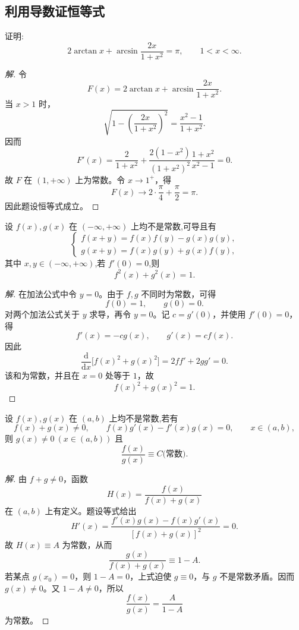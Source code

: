 \documentclass[../../数学分析培优讲义(答案版).tex]{subfiles}
\begin{document}
\subsection{利用导数证恒等式}

\begin{example}
证明:
\[
    2\arctan x+\arcsin\dfrac{2x}{1+x^2}=\pi,
    \qquad 1<x<\infty.
\]
\end{example}

\begin{proof}[解]
令
\[
    F(x)=2\arctan x+\arcsin\dfrac{2x}{1+x^2}.
\]
当 $x>1$ 时，
\[
    \sqrt{1-\left(\dfrac{2x}{1+x^2}\right)^2}
    =\dfrac{x^2-1}{1+x^2}.
\]
因而
\[
    F'(x)=\dfrac{2}{1+x^2}
    +\dfrac{2(1-x^2)}{(1+x^2)^2}
    \dfrac{1+x^2}{x^2-1}=0.
\]
故 $F$ 在 $(1,+\infty)$ 上为常数。令 $x\to1^+$，得
\[
    F(x)\longrightarrow2\cdot\dfrac{\pi}{4}+\dfrac{\pi}{2}=\pi.
\]
因此题设恒等式成立。
\end{proof}

\begin{example}
设 $f(x),g(x)$ 在 $(-\infty,+\infty)$ 上均不是常数,可导且有
\[
\begin{cases}
    f(x+y)=f(x)f(y)-g(x)g(y),\\
    g(x+y)=f(x)g(y)+g(x)f(y),
\end{cases}
\]
其中 $x,y\in(-\infty,+\infty)$,若 $f'(0)=0$,则
\[
    f^2(x)+g^2(x)=1.
\]
\end{example}

\begin{proof}[解]
在加法公式中令 $y=0$。由于 $f,g$ 不同时为常数，可得
\[
    f(0)=1,
    \qquad
    g(0)=0.
\]
对两个加法公式关于 $y$ 求导，再令 $y=0$。记 $c=g'(0)$，并使用 $f'(0)=0$，得
\[
    f'(x)=-c g(x),
    \qquad
    g'(x)=c f(x).
\]
因此
\[
    \dfrac{\mathrm{d}}{\mathrm{d}x}\bigl[f(x)^2+g(x)^2\bigr]
    =2ff'+2gg'=0.
\]
该和为常数，并且在 $x=0$ 处等于 $1$，故
\[
    f(x)^2+g(x)^2=1.
\]
\end{proof}

\begin{example}
设 $f(x),g(x)$ 在 $(a,b)$ 上均不是常数,若有
\[
    f(x)+g(x)\neq0,
    \qquad
    f(x)g'(x)-f'(x)g(x)=0,
    \qquad x\in(a,b),
\]
则 $g(x)\neq0\ (x\in(a,b))$ 且
\[
    \dfrac{f(x)}{g(x)}\equiv C\text{(常数)}.
\]
\end{example}

\begin{proof}[解]
由 $f+g\neq0$，函数
\[
    H(x)=\dfrac{f(x)}{f(x)+g(x)}
\]
在 $(a,b)$ 上有定义。题设等式给出
\[
    H'(x)=\dfrac{f'(x)g(x)-f(x)g'(x)}{[f(x)+g(x)]^2}=0.
\]
故 $H(x)\equiv A$ 为常数，从而
\[
    \dfrac{g(x)}{f(x)+g(x)}\equiv1-A.
\]
若某点 $g(x_0)=0$，则 $1-A=0$，上式迫使 $g\equiv0$，与 $g$ 不是常数矛盾。因而 $g(x)\neq0$。又 $1-A\neq0$，所以
\[
    \dfrac{f(x)}{g(x)}
    =\dfrac{A}{1-A}
\]
为常数。
\end{proof}
\end{document}
